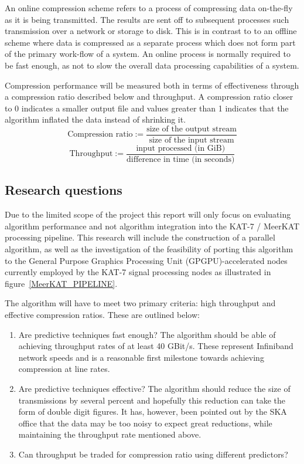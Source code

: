 An online compression scheme refers to a process of compressing data on-the-fly as it is being transmitted. The results are sent off to subsequent 
processes such transmission over a network or storage to disk. This is in contrast to to an offline scheme where data is compressed as a separate process which does not
form part of the primary work-flow of a system. An online process is normally required to be fast enough, as not to slow the overall data processing capabilities of 
a system.

Compression performance will be measured both in terms of effectiveness through a compression ratio described below \cite[p. 10]{salomon2004data} and throughput. A 
compression ratio closer to 0 indicates a smaller output file and values greater than 1 indicates that the algorithm inflated the data instead of shrinking it.
\begin{equation}
 \text{Compression ratio} := \frac{\text{size of the output stream}}{\text{size of the input stream}}
\end{equation}
\begin{equation}
 \text{Throughput} := \frac{\text{input processed (in GiB)}}{\text{difference in time (in seconds)}}
\end{equation}
\subsection{Research questions}
Due to the limited scope of the project this report will only focus on evaluating algorithm performance and not algorithm integration into the KAT-7 / MeerKAT processing
pipeline. This research will include the construction of a parallel algorithm, as well as the investigation of the feasibility of porting this algorithm to the General 
Purpose Graphics Processing Unit (GPGPU)-accelerated nodes currently employed by the KAT-7 signal processing nodes as illustrated in figure~\ref{MeerKAT_PIPELINE}.

The algorithm will have to meet two primary criteria: high throughput and effective compression ratios. These are outlined below:
\begin{enumerate}
 \item Are predictive techniques fast enough? The algorithm should be able of achieving throughput rates of at least 40 GBit/s. These represent Infiniband network speeds 
 and is a reasonable first milestone towards achieving compression at line rates.
 \item Are predictive techniques effective? The algorithm should reduce the size of transmissions by several percent and hopefully this reduction can take the form of 
       double digit figures. It has, however, been pointed out by the SKA office that the data may be too noisy to expect great reductions, while maintaining the throughput 
       rate mentioned above.
 \item Can throughput be traded for compression ratio using different predictors?
\end{enumerate}


